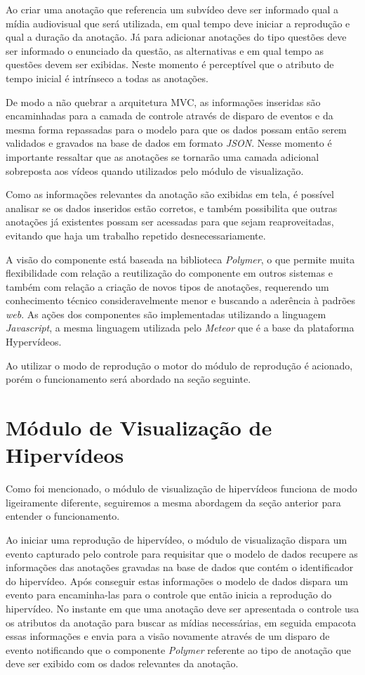Ao criar uma anotação que referencia um subvídeo deve ser informado qual a mídia audiovisual que será utilizada, em qual tempo deve iniciar a reprodução e qual a duração da anotação. Já para adicionar anotações do tipo questões deve ser informado o enunciado da questão, as alternativas e em qual tempo as questões devem ser exibidas. Neste momento é perceptível que o atributo de tempo inicial é intrínseco a todas as anotações.

De modo a não quebrar a arquitetura MVC, as informações inseridas são encaminhadas para a camada de controle através de disparo de eventos e da mesma forma repassadas para o modelo para que os dados possam então serem validados e gravados na base de dados em formato \textit{JSON}. Nesse momento é importante ressaltar que as anotações se tornarão uma camada adicional sobreposta aos vídeos quando utilizados pelo módulo de visualização.

Como as informações relevantes da anotação são exibidas em tela, é possível analisar se os dados inseridos estão corretos, e também possibilita que outras anotações já existentes possam ser acessadas para que sejam reaproveitadas, evitando que haja um trabalho repetido desnecessariamente.

A visão do componente está baseada na biblioteca \textit{Polymer}, o que permite muita flexibilidade com relação a reutilização do componente em outros sistemas e também com relação a criação de novos tipos de anotações, requerendo um conhecimento técnico consideravelmente menor e buscando a aderência à padrões \textit{web}. As ações dos componentes são implementadas utilizando a linguagem \textit{Javascript}, a mesma linguagem utilizada pelo \textit{Meteor} que é a base da plataforma Hypervídeos.

Ao utilizar o modo de reprodução o motor do módulo de reprodução é acionado, porém o funcionamento será abordado na seção seguinte.

\section{Módulo de Visualização de Hipervídeos}

Como foi mencionado, o módulo de visualização de hipervídeos funciona de modo ligeiramente diferente, seguiremos a mesma abordagem da seção anterior para entender o funcionamento.

Ao iniciar uma reprodução de hipervídeo, o módulo de visualização dispara um evento capturado pelo controle para requisitar que o modelo de dados recupere as informações das anotações gravadas na base de dados que contém o identificador do hipervídeo. Após conseguir estas informações o modelo de dados dispara um evento para encaminha-las para o controle que então inicia a reprodução do hipervídeo. No instante em que uma anotação deve ser apresentada o controle usa os atributos da anotação para buscar as mídias necessárias, em seguida empacota essas informações e envia para a visão novamente através de um disparo de evento notificando que o componente \textit{Polymer} referente ao tipo de anotação que deve ser exibido com os dados relevantes da anotação.


